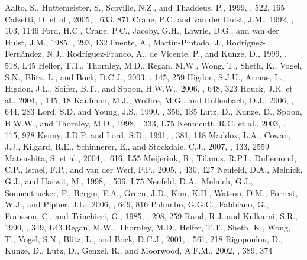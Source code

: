 \documentclass[manuscript]{aastex}
\begin{document}
\begin{thebibliography}{}
 Aalto, S., Huttemeister, S., Scoville, N.Z., and Thaddeus, P., 1999, \aj, 522, 165
 Calzetti, D. et al., 2005, \apj, 633, 871
 Crane, P.C. and van der Hulst, J.M., 1992, \aj, 103, 1146
 Ford, H.C., Crane, P.C., Jacoby, G.H., Lawrie, D.G., and van der Hulst, J.M., 1985, \apj, 293, 132
 Fuente, A., Mart\'{i}n-Pintado, J., Rodr\'{i}guez-Fern\'{a}ndez, N.J., Rodr\'{i}guez-Franco, A., de Vicente, P., and Kunze, D., 1999, \apj, 518, L45 
 Helfer, T.T., Thornley, M.D., Regan, M.W., Wong, T., Sheth, K., Vogel, S.N., Blitz, L., and Bock, D.C.J., 2003, \apjs, 145, 259
 Higdon, S.J.U., Armus, L., Higdon, J.L., Soifer, B.T., and Spoon, H.W.W., 2006, \apj, 648, 323
 Houck, J.R. et al., 2004, \apjs, 145, 18
 Kaufman, M.J., Wolfire, M.G., and Hollenbach, D.J., 2006, \apj, 644, 283 
 Lord, S.D. and Young, J.S., 1990, \apj, 356, 135
 Lutz, D., Kunze, D., Spoon, H.W.W., and Thornley, M.D., 1998, \aap, 333, L75
 Kennicutt, R.C. et al., 2003, \pasp, 115, 928
 Kenny, J.D.P. and Lord, S.D., 1991, \apj, 381, 118
 Maddox, L.A., Cowan, J.J., Kilgard, R.E., Schinnerer, E., and Stockdale, C.J., 2007, \aj, 133, 2559
 Matsushita, S. et al., 2004, \apj, 616, L55
 Meijerink, R., Tilanus, R.P.I., Dullemond, C.P., Israel, F.P., and van der Werf, P.P., 2005, \aap, 430, 427
 Neufeld, D.A., Melnick, G.J., and Harwit, M., 1998, \apj, 506, L75
 Neufeld, D.A., Melnich, G.J., Sonnentrucker, P., Bergin, E.A., Green, J.D., Kim, K.H., Watson, D.M., Forrest, W.J., and Pipher, J.L., 2006, \apj, 649, 816 
 Palumbo, G.G.C., Fabbiano, G., Fransson, C., and Trinchieri, G., 1985, \apj, 298, 259 
 Rand, R.J. and Kulkarni, S.R., 1990, \apj, 349, L43
 Regan, M.W., Thornley, M.D., Helfer, T.T., Sheth, K., Wong, T., Vogel, S.N., Blitz, L., and Bock, D.C.J., 2001, \apj, 561, 218
 Rigopoulou, D., Kunze, D., Lutz, D., Genzel, R., and Moorwood, A.F.M., 2002, \aap, 389, 374

\end{thebibliography}
\end{document}
